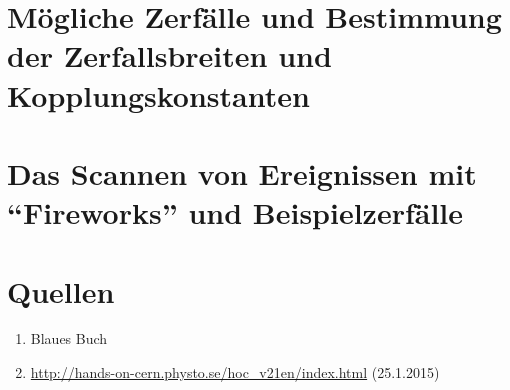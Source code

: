 \documentclass[a4paper,ngerman]{scrartcl}
\begin{document}
\section{Mögliche Zerfälle und Bestimmung der Zerfallsbreiten und Kopplungskonstanten}
\label{sec:zerfaelle}



\section{Das Scannen von Ereignissen mit "`Fireworks"' und Beispielzerfälle}
\label{sec:scannen}

\section{Quellen}
\begin{enumerate}
\item Blaues Buch \label{ref:BB}
\item \url{http://hands-on-cern.physto.se/hoc_v21en/index.html} (25.1.2015)\label{ref:hands-on}
\end{enumerate}
\end{document}
